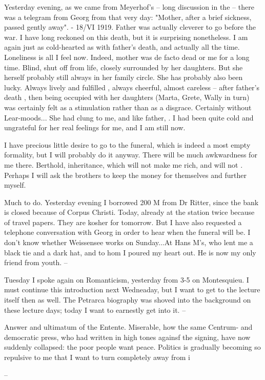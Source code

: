 
Yesterday evening, as we came from Meyerhof's -- long discussion in the  -- there was a telegram from Georg from that very day: "Mother, after a brief sickness, passed gently away".  - 18/VI 1919. Father was actually cleverer to go before the war. I have long reckoned on this death, but it is surprising nonetheless. I am again just as cold-hearted as with father's death, and actually all the time. Loneliness is all I feel now. Indeed, mother was de facto dead or me for a long time. Blind, shut off from life, closely surrounded by her daughters. But she herself probably still always  in her family circle. She has probably also been lucky. Always lively and fulfilled , always cheerful, almost careless -- after father's death , then being occupied with her daughters (Marta, Grete, Wally in turn) was certainly felt as a stimulation rather than as a disgrace. Certainly without Lear-moods... She had clung to me, and like father, . I had been quite cold and ungrateful for her real feelings for me, and I am still now.

I have precious little desire to go to the funeral, which is indeed a most empty formality, but I will probably do it anyway. There will be much awkwardness for me there. Berthold, inheritance, which will not make me rich, and will not . Perhaps I will ask the brothers to keep the money for themselves and further  myself.

Much to do. Yesterday evening I borrowed 200 M from Dr Ritter, since the bank is closed because of Corpus Christi. Today, already at the station twice because of travel papers. They are kosher for tomorrow. But I have also requested a telephone conversation with Georg in order to hear when the funeral will be. I don't know whether Weissensee works on Sunday...At Hans M's, who lent me a black tie and a dark hat, and to 
hom I poured my heart out. He is now my only friend from youth. --

Tuesday I spoke again on Romanticism, yesterday from 3-5 on Montesquieu. I must continue this introduction next Wedneaday, but I want to get to the lecture itself then as well. The Petrarca biography was shoved into the background on these lecture days; today I want to earnestly get into it. --

Answer and ultimatum of the Entente. Miserable, how the same Centrum- and democratic press, who had written in high tones againsf the signing, have now suddenly collapsed: the poor people want peace. Politics is gradually becoming so repulsive to me that I want to turn completely away from i

 --
